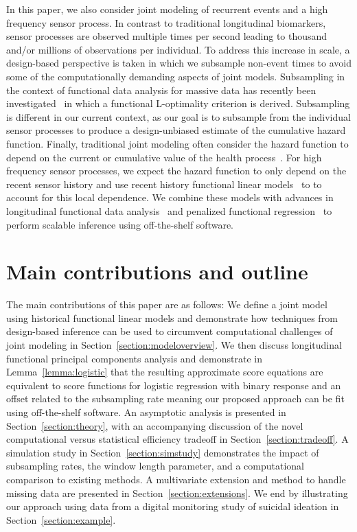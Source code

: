 \documentclass[12pt]{amsart}
\newenvironment{newmaterial}{\color{blue}}{\par}
\begin{document}
\begin{newmaterial}
In this paper, we also consider joint modeling of recurrent events and a high frequency sensor process. In contrast to traditional longitudinal biomarkers, sensor processes are observed multiple times per second leading to thousand and/or millions of observations per individual.  To address this increase in scale, a design-based perspective is taken in which we subsample non-event times to avoid some of the computationally demanding aspects of joint models.  Subsampling in the context of functional data analysis for massive data has recently been investigated~\citep{https://doi.org/10.48550/arxiv.2104.03446} in which a functional L-optimality criterion is derived. Subsampling is different in our current context, as our goal is to subsample from the individual sensor processes to produce a design-unbiased estimate of the cumulative hazard function.  Finally, traditional joint modeling often consider the hazard function to depend on the current or cumulative value of the health process~\citep{Li2022,Rizopoulos2010}. For high frequency sensor processes, we expect the hazard function to only depend on the recent sensor history and use recent history functional linear models~\cite{KIM20111554} to to account for this local dependence.  We combine these models with advances in longitudinal functional data analysis~\citep{Staicu2010} and penalized functional regression~\citep{Goldsmith2015} to perform scalable inference using off-the-shelf software.


\section{Main contributions and outline}

The main contributions of this paper are as follows:
We define a joint model using historical functional linear models and demonstrate how techniques from design-based inference can be used to circumvent computational challenges of joint modeling in Section~\ref{section:modeloverview}. We then discuss longitudinal functional principal components analysis and demonstrate in Lemma~\ref{lemma:logistic} that the resulting approximate score equations are equivalent to score functions for logistic regression with binary response and an offset related to the subsampling rate meaning our proposed approach can be fit using off-the-shelf software.  An asymptotic analysis is presented in Section~\ref{section:theory}, with an accompanying discussion of the novel computational versus statistical efficiency tradeoff in Section~\ref{section:tradeoff}.   A simulation study in Section~\ref{section:simstudy} demonstrates the impact of subsampling rates, the window length parameter, and a computational comparison to existing methods.  A multivariate extension and method to handle missing data are presented in Section~\ref{section:extensions}.  We end by illustrating our approach using data from a digital monitoring study of suicidal ideation in Section~\ref{section:example}.

\end{newmaterial}
\end{document}
